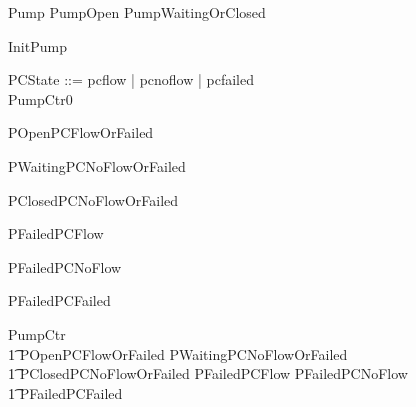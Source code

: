 \documentclass{report} %
\begin{document}
\begin{zed}
  Pump  PumpOpen \land PumpWaitingOrClosed
\end{zed}

\begin{zed}
  InitPump 
\end{zed}

\begin{zed}
  PCState ::= pcflow | pcnoflow | pcfailed \\
  PumpCtr0 
\end{zed}

\begin{zed}
  POpenPCFlowOrFailed 
\end{zed}

\begin{zed}
  PWaitingPCNoFlowOrFailed 
\end{zed}

\begin{zed}
  PClosedPCNoFlowOrFailed 
\end{zed}

\begin{zed}
  PFailedPCFlow 
\end{zed}

\begin{zed}
  PFailedPCNoFlow 
\end{zed}

\begin{zed}
  PFailedPCFailed 
\end{zed}

\begin{zed}
  PumpCtr  \\ %
  \t1 POpenPCFlowOrFailed \land PWaitingPCNoFlowOrFailed \land \\ %
  \t1 PClosedPCNoFlowOrFailed \land PFailedPCFlow \land PFailedPCNoFlow \land  \\
  \t1 PFailedPCFailed
\end{zed}
\end{document}
